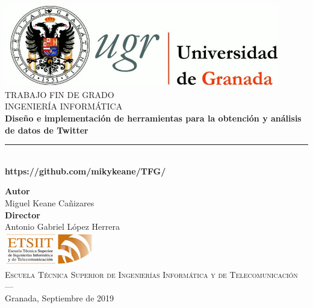 
 
\newlength{\centeroffset}
\setlength{\centeroffset}{-0.5\oddsidemargin}
\addtolength{\centeroffset}{0.5\evensidemargin}
\thispagestyle{empty}

\noindent\hspace*{\centeroffset}\begin{minipage}{\textwidth}

\centering
\includegraphics[width=0.9\textwidth]{imagenes/logo_ugr.jpg}\\[1.4cm]

\textsc{ \Large TRABAJO FIN DE GRADO\\[0.2cm]}
\textsc{ INGENIERÍA INFORMÁTICA}\\[1cm]
% 
{\Huge\bfseries Diseño e implementación de herramientas para la obtención y análisis de datos de Twitter\
}
\noindent\rule[-1ex]{\textwidth}{3pt}\\[3.5ex]
{\large\bfseries https://github.com/mikykeane/TFG/}
\end{minipage}

\vspace{2.5cm}
\noindent\hspace*{\centeroffset}\begin{minipage}{\textwidth}
\centering

\textbf{Autor}\\ {Miguel Keane Cañizares }\\[2.5ex]
\textbf{Director}\\
{Antonio Gabriel López Herrera }\\
\includegraphics[width=0.3\textwidth]{imagenes/etsiit_logo.png}\\[0.1cm]
\textsc{Escuela Técnica Superior de Ingenierías Informática y de Telecomunicación}\\
\textsc{---}\\
Granada, Septiembre de 2019
\end{minipage}



